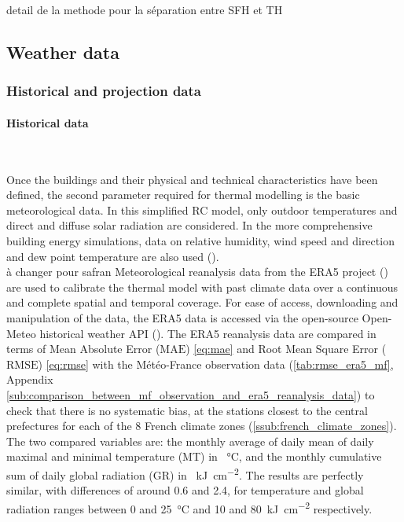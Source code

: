 \documentclass[11pt]{article}
\begin{document}
        detail de la methode pour la séparation entre SFH et TH

        






    


    \clearpage
    \subsection{Weather data} %
    \label{sub:weather_data}

        
        \subsubsection{Historical and projection data} %
        \label{ssub:historical_data}
        
        \paragraph{Historical data}\mbox{}\\ %
        \label{par:historical_data}
        
        Once the buildings and their physical and technical characteristics have been defined, the second parameter required for thermal modelling is the basic meteorological data. In this simplified RC model, only outdoor temperatures and direct and diffuse solar radiation are considered. In the more comprehensive building energy simulations, data on relative humidity, wind speed and direction and dew point temperature are also used (\cite{bhandari_evaluation_2012}).\\

        {\color{red} à changer pour safran}
        Meteorological reanalysis data from the ERA5 project (\cite{hersbach_era5_2020}) are used to calibrate the thermal model with past climate data over a continuous and complete spatial and temporal coverage. For ease of access, downloading and manipulation of the data, the ERA5 data is accessed via the open-source Open-Meteo historical weather API (\cite{zippenfenig_open-meteocom_2024}). The ERA5 reanalysis data are compared in terms of Mean Absolute Error ($\mathrm{MAE}$) \eqref{eq:mae} and Root Mean Square Error ($\mathrm{RMSE}$) \eqref{eq:rmse} with the Météo-France observation data (\ref{tab:rmse_era5_mf}, Appendix \ref{sub:comparison_between_mf_observation_and_era5_reanalysis_data}) to check that there is no systematic bias, at the stations closest to the central prefectures for each of the 8 French climate zones (\ref{ssub:french_climate_zones}). The two compared variables are: the monthly average of daily mean of daily maximal and minimal temperature (MT) in \SI{}{\celsius}, and the monthly cumulative sum of daily global radiation (GR) in \SI{}{\kilo\joule\per\square\centi\meter}. The results are perfectly similar, with differences of around \num{0.6} and \num{2.4}, for temperature and global radiation ranges between 0 and \SI{25}{\celsius} and 10 and \SI{80}{\kilo\joule\per\square\centi\meter} respectively. 
\end{document}
